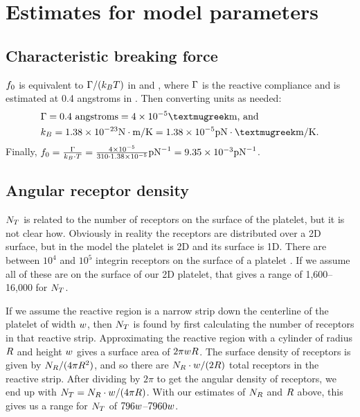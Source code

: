 \documentclass{article}
\newcommand{\inv}{^{-1}}
\begin{document}
\section{Estimates for model parameters}
\label{sec:estim-model-param}

\subsection{Characteristic breaking force}
\label{sec:char-break-force}

$f_0$ is equivalent to $\Gamma/(k_BT)$ in
\cite{Pospieszalska2009} and \cite{Sundd2011}, where $\Gamma$ is
the reactive compliance and is estimated at 0.4 angstroms in
\cite{Bhatia2003}. Then converting units as needed:
\begin{align*}
  &\compliance = 0.4 \text{ angstroms} = 4 \times 10^{-5}
    \text{{\textmugreek}m} \text{, and} \\
  &\boltzmann = 1.38 \times 10^{-23} \text{N}\cdot\text{m}/\text{K} =
    1.38 \times 10^{-5} \text{pN}\cdot\text{{\textmugreek}m}/\text{K}.
\end{align*}
Finally, $\refForce = \frac{\compliance}{\boltzmann\cdot\temp} =
\frac{4 \times 10^{-5}}{310 \cdot 1.38 \times 10^{-5}} \text{pN}\inv =
9.35 \times 10^{-3} \text{pN}\inv$.

\subsection{Angular receptor density}
\label{sec:ang-rec-dens}

$N_T$ is related to the number of receptors on the
surface of the platelet, but it is not clear how. Obviously in reality
the receptors are distributed over a 2D surface, but in the model the
platelet is 2D and its surface is 1D. There are between $10^4$ and $10^5$
integrin receptors on the surface of a platelet
\cite{Burkhart2012}. If we assume all of these are on the surface of
our 2D platelet, that gives a range of 1,600--16,000 for $N_T$. 

If we assume the reactive region is a narrow strip down the centerline
of the platelet of width $w$, then $N_T$ is found by
first calculating the number of receptors in that reactive
strip. Approximating the reactive region with a cylinder of radius
$R$ and height $w$ gives a surface area of
$2\pi wR$. The surface density of receptors is given by
$N_R/(4\pi R^2)$, and so there are
$N_R\cdot w/(2R)$ total receptors in the
reactive strip. After dividing by $2\pi$ to get the angular density of
receptors, we end up with $N_T =
N_R\cdot w/(4\pi R)$. With our estimates of
$N_R$ and $R$ above, this gives us a range for
$N_T$ of $796w$--$7960w$.
\end{document}

